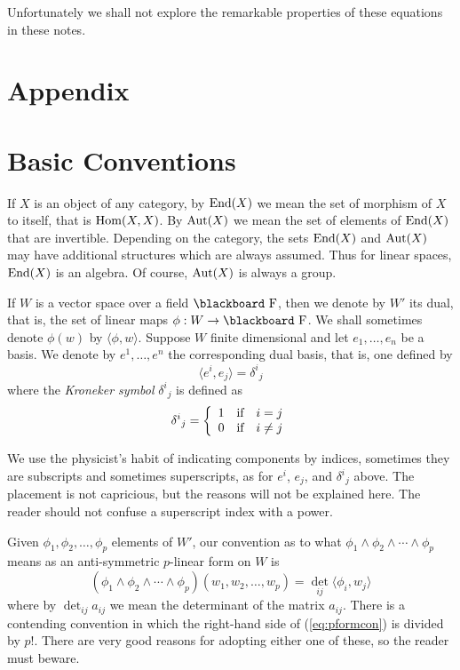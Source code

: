 \documentclass[12pt,titlepage]{article}
\def\bbf#1{\hbox{\blackboard #1}}
\def\lF{\bbf F}
\def\Aut{\hbox{Aut}}
\def\End{\hbox{End}}
\def\Hom{\hbox{Hom}}
\begin{document}
Unfortunately we shall not explore the remarkable properties of these
equations in these notes.

\section*{Appendix}%

\appendix

\section{Basic Conventions}\label{sec:bacon}%

If \(X\) is an object of any category, by \(\End(X)\) we mean the set of
morphism of \(X\) to itself, that is \(\Hom(X,X)\). By \(\Aut(X)\) we
mean the set of elements of \(\End(X)\) that are invertible.
Depending on the category, the sets \(\End(X)\) and \(\Aut(X)\) may have
additional structures which are always assumed. Thus for linear spaces,
\(\End(X)\) is an algebra. Of course, \(\Aut(X)\) is always a group. 

If \(W\) is a vector space over a 
field \(\lF\), then we denote by \(W'\)
%
 its dual, that is, the set of
linear maps \(\phi : W\to \lF\). We shall sometimes denote  \(\phi(w)\)
by \(\langle \phi,w \rangle\). Suppose \(W\) finite dimensional and let 
\(e_1,\dots,e_n\) be a basis. We denote by \(e^1,\dots,e^n\) the
corresponding dual basis,
%
 that is, one defined by
\[
\langle e^i,e_j \rangle = \delta^i{}_j
\]
where the {\em Kroneker
symbol\/} 
%
\(\delta^i{}_j\) is defined as 
\[
\delta^i{}_j = \left\{\begin{array}{cc} 1 & \hbox{if}\quad i=j \\
0 & \hbox{if}\quad i\neq j\end{array}\right.
\]

We use the physicist's habit of indicating components by indices,
sometimes they are subscripts and sometimes superscripts, as for \(e^i\),
\(e_j\), and  \(\delta^i{}_j\) above. The placement is not capricious,
but the reasons will not be explained here. The reader should not
confuse a superscript index with a power.


Given \(\phi_1,\phi_2,\dots,\phi_p\) elements of \(W'\), 
our convention as to
what \(\phi_1\wedge\phi_2\wedge\cdots\wedge\phi_p\) means as an anti-symmetric
\(p\)-linear form on \(W\) is 
\begin{equation}\label{eq:pformcon}%
(\phi_1\wedge\phi_2\wedge\cdots\wedge\phi_p)(w_1,w_2,\dots,w_p) =
\det_{ij}\langle\phi_i,w_j\rangle
\end{equation}%
where by \(\det_{ij}a_{ij}\) we mean the determinant of the matrix
\(a_{ij}\). There is a contending convention in which the right-hand side
of (\ref{eq:pformcon}) is divided by \(p!\). There are very good
reasons for adopting either one of these, so the reader must beware.
\end{document}
